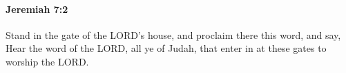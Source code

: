 
		\paragraph{Jeremiah 7:2} %
			\label{JEREMIAH-7-2}

			Stand in the gate of the LORD’s house, and proclaim there this word, and say, Hear the word of the LORD, all ye of Judah, that enter in at these gates to worship the LORD.


